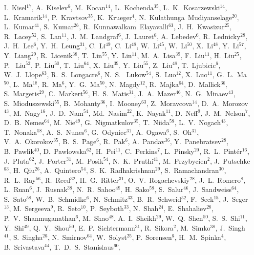 {I.~Kisel$^{17}$,
A.~Kiselev$^{6}$,
M.~Kocan$^{14}$,
L.~Kochenda$^{35}$,
L.~K.~Kosarzewski$^{14}$,
L.~Kramarik$^{14}$,
P.~Kravtsov$^{35}$,
K.~Krueger$^{4}$,
N.~Kulathunga~Mudiyanselage$^{20}$,
L.~Kumar$^{41}$,
S.~Kumar$^{26}$,
R.~Kunnawalkam~Elayavalli$^{63}$,
J.~H.~Kwasizur$^{25}$,
R.~Lacey$^{52}$,
S.~Lan$^{11}$,
J.~M.~Landgraf$^{6}$,
J.~Lauret$^{6}$,
A.~Lebedev$^{6}$,
R.~Lednicky$^{28}$,
J.~H.~Lee$^{6}$,
Y.~H.~Leung$^{31}$,
C.~Li$^{49}$,
C.~Li$^{48}$,
W.~Li$^{45}$,
W.~Li$^{50}$,
X.~Li$^{48}$,
Y.~Li$^{57}$,
Y.~Liang$^{29}$,
R.~Licenik$^{38}$,
T.~Lin$^{55}$,
Y.~Lin$^{11}$,
M.~A.~Lisa$^{39}$,
F.~Liu$^{11}$,
H.~Liu$^{25}$,
P.~ Liu$^{52}$,
P.~Liu$^{50}$,
T.~Liu$^{64}$,
X.~Liu$^{39}$,
Y.~Liu$^{55}$,
Z.~Liu$^{48}$,
T.~Ljubicic$^{6}$,
W.~J.~Llope$^{63}$,
R.~S.~Longacre$^{6}$,
N.~S.~ Lukow$^{54}$,
S.~Luo$^{12}$,
X.~Luo$^{11}$,
G.~L.~Ma$^{50}$,
L.~Ma$^{18}$,
R.~Ma$^{6}$,
Y.~G.~Ma$^{50}$,
N.~Magdy$^{12}$,
R.~Majka$^{64}$,
D.~Mallick$^{36}$,
S.~Margetis$^{29}$,
C.~Markert$^{56}$,
H.~S.~Matis$^{31}$,
J.~A.~Mazer$^{46}$,
N.~G.~Minaev$^{43}$,
S.~Mioduszewski$^{55}$,
B.~Mohanty$^{36}$,
I.~Mooney$^{63}$,
Z.~Moravcova$^{14}$,
D.~A.~Morozov$^{43}$,
M.~Nagy$^{16}$,
J.~D.~Nam$^{54}$,
Md.~Nasim$^{22}$,
K.~Nayak$^{11}$,
D.~Neff$^{9}$,
J.~M.~Nelson$^{7}$,
D.~B.~Nemes$^{64}$,
M.~Nie$^{49}$,
G.~Nigmatkulov$^{35}$,
T.~Niida$^{58}$,
L.~V.~Nogach$^{43}$,
T.~Nonaka$^{58}$,
A.~S.~Nunes$^{6}$,
G.~Odyniec$^{31}$,
A.~Ogawa$^{6}$,
S.~Oh$^{31}$,
V.~A.~Okorokov$^{35}$,
B.~S.~Page$^{6}$,
R.~Pak$^{6}$,
A.~Pandav$^{36}$,
Y.~Panebratsev$^{28}$,
B.~Pawlik$^{40}$,
D.~Pawlowska$^{62}$,
H.~Pei$^{11}$,
C.~Perkins$^{7}$,
L.~Pinsky$^{20}$,
R.~L.~Pint\'{e}r$^{16}$,
J.~Pluta$^{62}$,
J.~Porter$^{31}$,
M.~Posik$^{54}$,
N.~K.~Pruthi$^{41}$,
M.~Przybycien$^{2}$,
J.~Putschke$^{63}$,
H.~Qiu$^{26}$,
A.~Quintero$^{54}$,
S.~K.~Radhakrishnan$^{29}$,
S.~Ramachandran$^{30}$,
R.~L.~Ray$^{56}$,
R.~Reed$^{32}$,
H.~G.~Ritter$^{31}$,
O.~V.~Rogachevskiy$^{28}$,
J.~L.~Romero$^{8}$,
L.~Ruan$^{6}$,
J.~Rusnak$^{38}$,
N.~R.~Sahoo$^{49}$,
H.~Sako$^{58}$,
S.~Salur$^{46}$,
J.~Sandweiss$^{64}$,
S.~Sato$^{58}$,
W.~B.~Schmidke$^{6}$,
N.~Schmitz$^{33}$,
B.~R.~Schweid$^{52}$,
F.~Seck$^{15}$,
J.~Seger$^{13}$,
M.~Sergeeva$^{9}$,
R.~Seto$^{10}$,
P.~Seyboth$^{33}$,
N.~Shah$^{24}$,
E.~Shahaliev$^{28}$,
P.~V.~Shanmuganathan$^{6}$,
M.~Shao$^{48}$,
A.~I.~Sheikh$^{29}$,
W.~Q.~Shen$^{50}$,
S.~S.~Shi$^{11}$,
Y.~Shi$^{49}$,
Q.~Y.~Shou$^{50}$,
E.~P.~Sichtermann$^{31}$,
R.~Sikora$^{2}$,
M.~Simko$^{38}$,
J.~Singh$^{41}$,
S.~Singha$^{26}$,
N.~Smirnov$^{64}$,
W.~Solyst$^{25}$,
P.~Sorensen$^{6}$,
H.~M.~Spinka$^{4}$,
B.~Srivastava$^{44}$,
T.~D.~S.~Stanislaus$^{60}$,
}
